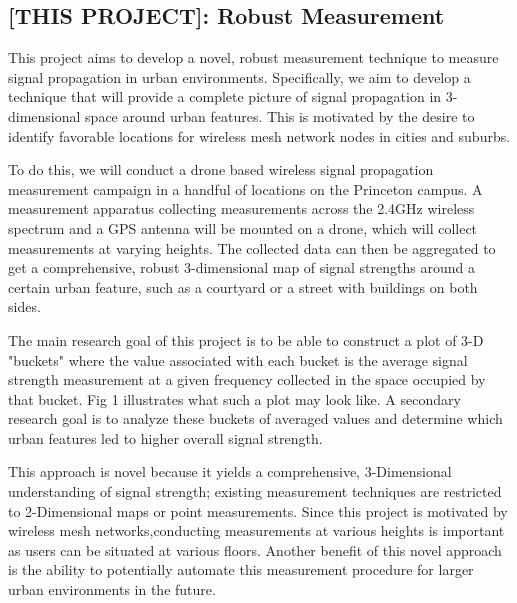 \documentclass[pageno]{jpaper}
\begin{document}
\subsection{[THIS PROJECT]: Robust Measurement}
This project aims to develop a novel, robust measurement technique to measure signal propagation in urban environments. Specifically, we aim to develop a technique that will provide a complete picture of signal propagation in 3-dimensional space around urban features. This is motivated by the desire to identify favorable locations for wireless mesh network nodes in cities and suburbs.

To do this, we will conduct a drone based wireless signal propagation measurement campaign in a handful of locations on the Princeton campus. A measurement apparatus collecting measurements across the 2.4GHz wireless spectrum and a GPS antenna will be mounted on a drone, which will collect measurements at varying heights. The collected data can then be aggregated to get a comprehensive, robust 3-dimensional map of signal strengths around a certain urban feature, such as a courtyard or a street with buildings on both sides.

The main research goal of this project is to be able to construct a plot of 3-D  "buckets" where the value associated with each bucket is the average signal strength measurement at a given frequency collected in the space occupied by that bucket. Fig 1 illustrates what such a plot may look like. A secondary research goal is to analyze these buckets of averaged values and determine which urban features led to higher overall signal strength.

This approach is novel because it yields a comprehensive, 3-Dimensional understanding of signal strength; existing measurement techniques are restricted to 2-Dimensional maps or point measurements. Since this project is motivated by wireless mesh networks,conducting measurements at various heights is important as users can be situated at various floors. Another benefit of this novel approach is the ability to potentially automate this measurement procedure for larger urban environments in the future. \\
\end{document}
